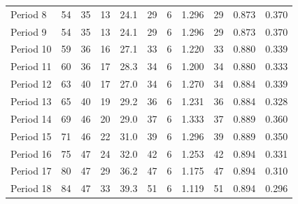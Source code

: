 \documentclass{article}
\theoremstyle{definition}
\begin{document}
\begin{table}[!hbtp]
{\begin{tabular}{lrrrrrrrrrr}
            Period 8  &       54 &       35 &                13 &              24.1 &                      29 &                          6 &       1.296 &             29 &       0.873 &             0.370 \\
            Period 9  &       54 &       35 &                13 &              24.1 &                      29 &                          6 &       1.296 &             29 &       0.873 &             0.370 \\
            Period 10 &       59 &       36 &                16 &              27.1 &                      33 &                          6 &       1.220 &             33 &       0.880 &             0.339 \\
            Period 11 &       60 &       36 &                17 &              28.3 &                      34 &                          6 &       1.200 &             34 &       0.880 &             0.333 \\
            Period 12 &       63 &       40 &                17 &              27.0 &                      34 &                          6 &       1.270 &             34 &       0.884 &             0.339 \\
            Period 13 &       65 &       40 &                19 &              29.2 &                      36 &                          6 &       1.231 &             36 &       0.884 &             0.328 \\
            Period 14 &       69 &       46 &                20 &              29.0 &                      37 &                          6 &       1.333 &             37 &       0.889 &             0.360 \\
            Period 15 &       71 &       46 &                22 &              31.0 &                      39 &                          6 &       1.296 &             39 &       0.889 &             0.350 \\
            Period 16 &       75 &       47 &                24 &              32.0 &                      42 &                          6 &       1.253 &             42 &       0.894 &             0.331 \\
            Period 17 &       80 &       47 &                29 &              36.2 &                      47 &                          6 &       1.175 &             47 &       0.894 &             0.310 \\
            Period 18 &       84 &       47 &                33 &              39.3 &                      51 &                          6 &       1.119 &             51 &       0.894 &             0.296 \\

\end{tabular}}
\end{table}
\end{document}
